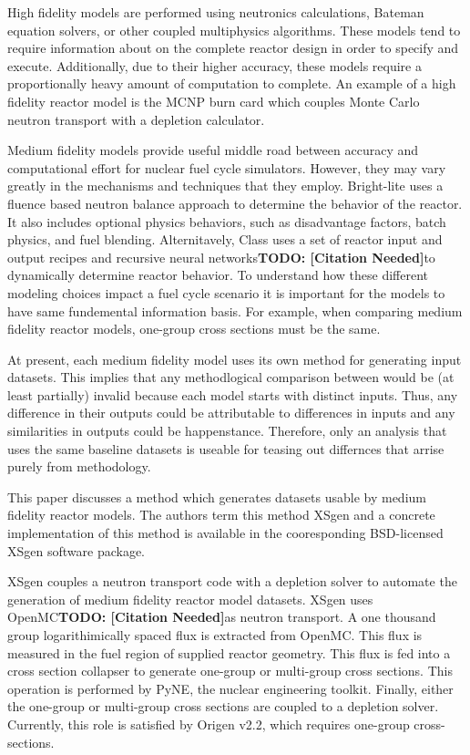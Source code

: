 \documentclass{article}
\newcommand{\TODO}[1] {{\color{red}\textbf{TODO: #1}}}
\newcommand{\citeme}{\TODO{[Citation Needed]}}
\begin{document}
High fidelity models are performed using neutronics calculations, Bateman
equation\cite{Bateman} solvers, or other coupled multiphysics algorithms. These models tend
to require information about on the complete reactor design in order to specify and execute.
Additionally, due to their higher accuracy, these models require a proportionally heavy amount
of computation to complete. An example of a high fidelity reactor model is the
MCNP\cite{mcnp5monte} burn card which couples Monte Carlo neutron transport with a depletion
calculator.

Medium fidelity models provide useful middle road between accuracy and computational effort
for nuclear fuel cycle simulators. However, they may vary greatly in the mechanisms and
techniques that they employ. Bright-lite uses a fluence based neutron balance approach to
determine the behavior of the reactor. It also includes optional physics behaviors, such as
disadvantage factors, batch physics, and fuel blending. Alternitavely, Class uses a set of
reactor input and output recipes and recursive neural networks\citeme to dynamically determine
reactor behavior. To understand how these different modeling choices impact a fuel cycle
scenario it is important for the models to have same fundemental information basis.
For example, when comparing medium fidelity reactor models, one-group cross sections
must be the same.

At present, each medium fidelity model uses its own method for generating input datasets.
This implies that any methodlogical comparison between would be (at least partially) invalid
because each model starts with distinct inputs. Thus, any difference in their outputs
could be attributable to differences in inputs and any similarities in outputs could be
happenstance. Therefore, only an analysis that uses the same baseline datasets
is useable for teasing out differnces that arrise purely from methodology.

This paper discusses a method which generates datasets usable by medium fidelity reactor models.
The authors term this method XSgen and a concrete implementation of this method is available
in the cooresponding BSD-licensed XSgen software package.

XSgen couples a neutron transport code with a depletion solver to automate the generation of
medium fidelity reactor model datasets. XSgen uses OpenMC\citeme as neutron transport.
A one thousand group logarithimically spaced flux is extracted from OpenMC. This flux is
measured in the fuel region of supplied reactor geometry. This flux is fed into a cross
section collapser to generate one-group or multi-group cross sections. This operation is
performed by PyNE\cite{pyne}, the nuclear engineering toolkit. Finally, either the
one-group or multi-group cross sections are coupled to a depletion solver. Currently, this
role is satisfied by Origen v2.2\cite{origen2}, which requires one-group cross-sections.
\end{document}

